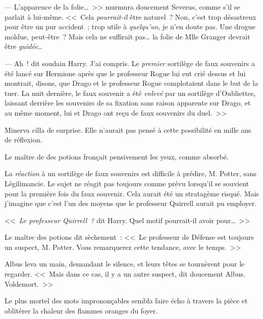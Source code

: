 --- L'apparence de la folie…~>> murmura doucement Severus, comme s'il se parlait à lui-même. <<~Cela \emph{pourrait-il} être naturel~? Non, c'est trop désastreux pour être un pur accident~; trop utile à \emph{quelqu'un}, je n'en doute pas. Une drogue moldue, peut-être~? Mais cela ne suffirait pas… la folie de Mlle Granger devrait être \emph{guidée}…

--- Ah~! dit soudain Harry. J'ai compris. Le \emph{premier} sortilège de faux souvenirs a été lancé sur Hermione après que le professeur Rogue lui eut crié dessus et lui montrait, disons, que Drago et le professeur Rogue complotaient dans le but de la tuer. La nuit dernière, le faux souvenir a été \emph{enlevé} par un sortilège d'Oubliettes, laissant derrière les souvenirs de sa fixation sans raison apparente sur Drago, et au même moment, lui et Drago ont reçu de faux souvenirs du duel.~>>

Minerva cilla de surprise. Elle n'aurait pas pensé à cette possibilité en mille ans de réflexion.

Le maître de des potions fronçait pensivement les yeux, comme absorbé.

La \emph{réaction} à un sortilège de faux souvenirs est difficile à prédire, M. Potter, sans Légilimancie. Le sujet ne réagit pas toujours comme prévu lorsqu'il se souvient pour la première fois du faux souvenir. Cela aurait été un stratagème risqué. Mais j'imagine que c'est l'un des moyens que le professeur Quirrell aurait pu employer.

<<~\emph{Le professeur Quirrell~?} dit Harry. Quel motif pourrait-il avoir pour…~>>

Le maître des potions dit sèchement~: <<~Le professeur de Défense est toujours un suspect, M. Potter. Vous remarquerez cette tendance, avec le temps.~>>

Albus leva un main, demandant le silence, et leurs têtes se tournèrent pour le regarder. <<~Mais dans ce cas, il y a un autre suspect, dit doucement Albus. Voldemort.~>>

Le plus mortel des mots imprononçables sembla faire écho à travers la pièce et oblitérer la chaleur des flammes oranges du foyer.

